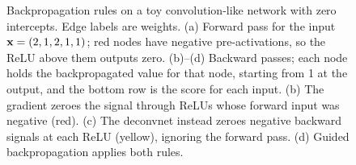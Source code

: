 \begin{figure}[tbp]
  \caption{Backpropagation rules on a toy convolution-like network with zero intercepts. Edge labels are weights. (a) Forward pass for the input $\mathbf{x}=(2,1,2,1,1)$; red nodes have negative pre-activations, so the ReLU above them outputs zero. (b)--(d) Backward passes; each node holds the backpropagated value for that node, starting from 1 at the output, and the bottom row is the score for each input. (b) The gradient zeroes the signal through ReLUs whose forward input was negative (red). (c) The deconvnet instead zeroes negative backward signals at each ReLU (yellow), ignoring the forward pass. (d) Guided backpropagation applies both rules.}
  \label{fig:toycnn}
\end{figure}

